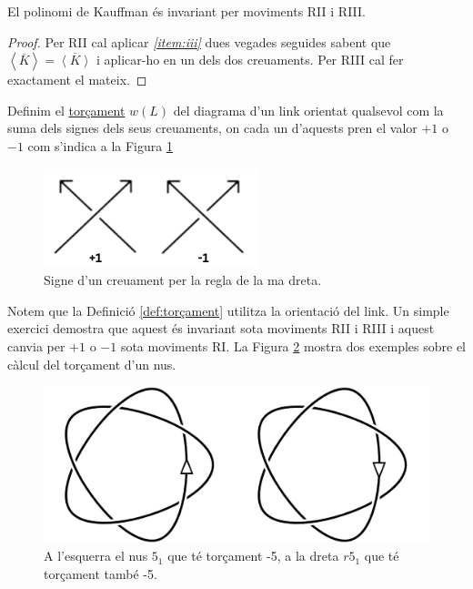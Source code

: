 \begin{lemma}\label{lem:RIIiRIII}
	El polinomi de Kauffman és invariant per moviments RII i RIII.
\end{lemma}

\begin{proof}
	Per RII cal aplicar \textit{\ref{item:iii}} dues vegades seguides sabent que $\left\langle\overline{K}\right\rangle=\overline{\left\langle K\right\rangle}$ i aplicar-ho en un dels dos creuaments. Per RIII cal fer exactament el mateix.
\end{proof}

\begin{definition}\label{def:torçament}
	Definim el \underline{torçament} $w(L)$ del diagrama d'un link orientat qualsevol com la suma dels signes dels seus creuaments, on cada un d'aquests pren el valor $+1$ o $-1$ com s'indica a la Figura \ref{fig:signe}
\end{definition}

\begin{figure}
	\centering
	\includegraphics[width=0.6\linewidth]{img/signe.png}
	\caption{Signe d'un creuament per la regla de la ma dreta.}\label{fig:signe}
\end{figure}

Notem que la Definició \ref{def:torçament} utilitza la orientació del link. Un simple exercici demostra que aquest és invariant sota moviments RII i RIII i aquest canvia per $+1$ o $-1$ sota moviments RI. La Figura \ref{fig:calculdelsigne} mostra dos exemples sobre el càlcul del torçament d'un nus.\\

\begin{figure}
	\centering
	\includegraphics[width=0.9\linewidth]{img/torçament.png}
	\caption{A l'esquerra el nus $5_1$ que té torçament -5, a la dreta $r5_1$ que té torçament també -5.}\label{fig:calculdelsigne}
\end{figure}

